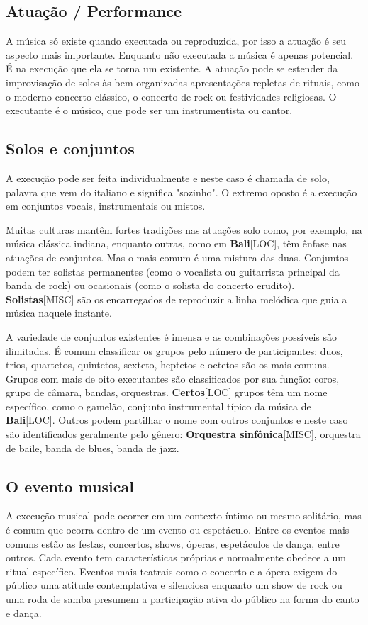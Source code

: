 \documentclass[a4paper,12pt]{article}
\begin{document}
\subsection*{Atuação / Performance}
A música só existe quando executada ou reproduzida, por isso a atuação é seu aspecto mais importante. Enquanto não executada a música é apenas potencial. É na execução que ela se torna um existente. A atuação pode se estender da improvisação de solos às bem-organizadas apresentações repletas de rituais, como o moderno concerto clássico, o concerto de rock ou festividades religiosas. O executante é o músico, que pode ser um instrumentista ou cantor.

\subsection*{Solos e conjuntos}
A execução pode ser feita individualmente e neste caso é chamada de solo, palavra que vem do italiano e significa "sozinho". O extremo oposto é a execução em conjuntos vocais, instrumentais ou mistos.

Muitas culturas mantêm fortes tradições nas atuações solo como, por exemplo, na música clássica indiana, enquanto outras, como em \textbf{Bali}\textsc{[LOC]}, têm ênfase nas atuações de conjuntos. Mas o mais comum é uma mistura das duas. Conjuntos podem ter solistas permanentes (como o vocalista ou guitarrista principal da banda de rock) ou ocasionais (como o solista do concerto erudito). \textbf{Solistas}\textsc{[MISC]} são os encarregados de reproduzir a linha melódica que guia a música naquele instante.

A variedade de conjuntos existentes é imensa e as combinações possíveis são ilimitadas. É comum classificar os grupos pelo número de participantes: duos, trios, quartetos, quintetos, sexteto, heptetos e octetos são os mais comuns. Grupos com mais de oito executantes são classificados por sua função: coros, grupo de câmara, bandas, orquestras. \textbf{Certos}\textsc{[LOC]} grupos têm um nome específico, como o gamelão, conjunto instrumental típico da música de \textbf{Bali}\textsc{[LOC]}. Outros podem partilhar o nome com outros conjuntos e neste caso são identificados geralmente pelo gênero: \textbf{Orquestra sinfônica}\textsc{[MISC]}, orquestra de baile, banda de blues, banda de jazz.

\subsection*{O evento musical}
A execução musical pode ocorrer em um contexto íntimo ou mesmo solitário, mas é comum que ocorra dentro de um evento ou espetáculo. Entre os eventos mais comuns estão as festas, concertos, shows, óperas, espetáculos de dança, entre outros. Cada evento tem características próprias e normalmente obedece a um ritual específico. Eventos mais teatrais como o concerto e a ópera exigem do público uma atitude contemplativa e silenciosa enquanto um show de rock ou uma roda de samba presumem a participação ativa do público na forma do canto e dança.
\end{document}
